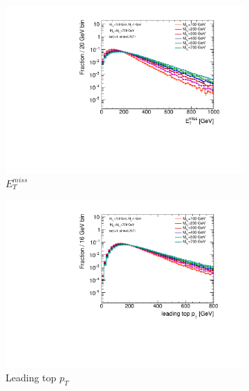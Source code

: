 \begin{figure}
  \centering
  \begin{subfigure}[b]{0.49\textwidth}
    \includegraphics[width=\textwidth]{texinputs/04_grid/figures/DMHF/benchmarking/MDM_1_MA_750_sinp_0.7071_tanb_1.0_SCAN_Ma/metlog.pdf}
    \caption{$E_{T}^{miss}$}
  \end{subfigure}
  \begin{subfigure}[b]{0.49\textwidth}
    \includegraphics[width=\textwidth]{texinputs/04_grid/figures/DMHF/benchmarking/MDM_1_MA_750_sinp_0.7071_tanb_1.0_SCAN_Ma/top1ptlog.pdf}
    \caption{Leading top $p_{T}$}
  \end{subfigure} \\
  \begin{subfigure}[b]{0.49\textwidth}

\end{subfigure}
\end{figure}
